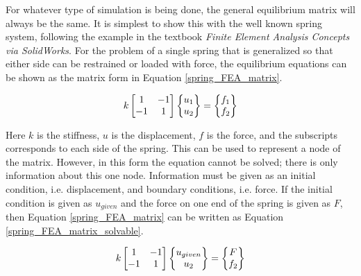 For whatever type of simulation is being done, the general equilibrium matrix will always be the same. It is simplest to show this with the well known spring system, following the example in the textbook \textit{Finite Element Analysis Concepts via SolidWorks}. For the problem of a single spring that is generalized so that either side can be restrained or loaded with force, the equilibrium equations can be shown as the matrix form in Equation \ref{spring_FEA_matrix}.

\begin{equation} \label{spring_FEA_matrix}
\begingroup
    k
    \begin{bmatrix}
        1 & -1 \\
        -1 & 1
    \end{bmatrix}
    \begin{Bmatrix}
        u_1 \\
        u_2 \\
    \end{Bmatrix}
    =
    \begin{Bmatrix}
        f_1 \\
        f_2 \\
    \end{Bmatrix}
\endgroup
\end{equation}

Here $k$ is the stiffness, $u$ is the displacement, $f$ is the force, and the subscripts corresponds to each side of the spring. This can be used to represent a node of the matrix. However, in this form the equation cannot be solved; there is only information about this one node. Information must be given as an initial condition, i.e. displacement, and boundary conditions, i.e. force. If the initial condition is given as $u_{given}$ and the force on one end of the spring is given as $F$, then Equation \ref{spring_FEA_matrix} can be written as Equation \ref{spring_FEA_matrix_solvable}.

\begin{equation} \label{spring_FEA_matrix_solvable}
\begingroup
    k
    \begin{bmatrix}
        1 & -1 \\
        -1 & 1
    \end{bmatrix}
    \begin{Bmatrix}
        u_{given} \\
        u_2 \\
    \end{Bmatrix}
    =
    \begin{Bmatrix}
        F \\
        f_2 \\
    \end{Bmatrix}
\endgroup
\end{equation}

